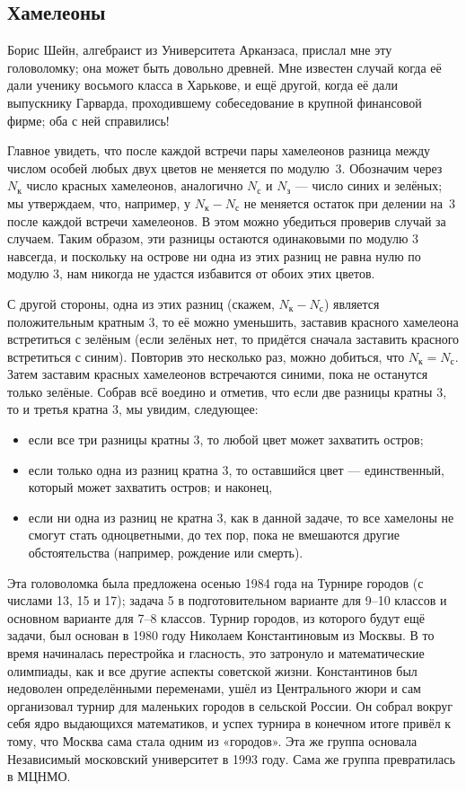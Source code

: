 \subsection*{Хамелеоны}

Борис Шейн, алгебраист из Университета Арканзаса, прислал мне эту головоломку; она может быть довольно древней.
Мне известен случай когда её дали ученику восьмого класса в Харькове,
и ещё другой, когда её дали выпускнику Гарварда, проходившему собеседование в крупной финансовой фирме;
оба с ней справились!

Главное увидеть, что после каждой встречи пары хамелеонов разница между числом особей любых двух цветов не меняется по модулю~3.
Обозначим через $N_{\text{к}}$ число красных хамелеонов, аналогично
$N_{\text{с}}$ и $N_{\text{з}}$ --- число синих и зелёных;
мы утверждаем, что, например, у $N_{\text{к}} - N_{\text{с}}$ не меняется остаток при делении на~$3$ после каждой встречи хамелеонов.
В этом можно убедиться проверив случай за случаем.
Таким образом, эти разницы остаются одинаковыми по модулю 3 навсегда, и поскольку на острове ни одна из этих разниц не равна нулю по модулю 3, нам никогда не удастся избавится от обоих этих цветов.

С другой стороны, одна из этих разниц (скажем, $N_{\text{к}} - N_{\text{с}}$) является положительным кратным $3$, то её можно уменьшить, заставив красного хамелеона встретиться с зелёным (если зелёных нет, то придётся сначала заставить красного встретиться с синим).
Повторив это несколько раз, можно добиться, что $N_{\text{к}} = N_{\text{с}}$.
Затем заставим красных хамелеонов встречаются синими, пока не останутся только зелёные.
Собрав всё воедино и отметив, что если две разницы кратны $3$, то и третья кратна $3$, мы увидим, следующее:
\begin{itemize}
\item если все три разницы кратны 3, то любой цвет может захватить остров;
\item если только одна из разниц кратна 3, то оставшийся цвет --- единственный, который может захватить остров; и наконец,
\item если ни одна из разниц не кратна 3, как в данной задаче, то все хамелоны не смогут стать одноцветными, до тех пор, пока не вмешаются другие обстоятельства (например, рождение или смерть).
\end{itemize}

Эта головоломка была предложена осенью 1984 года на Турнире городов (с числами 13, 15 и 17);
задача 5 в подготовительном варианте для 9--10 классов и основном варианте для 7--8 классов.
Турнир городов, из которого будут ещё задачи, был основан в 1980 году Николаем Константиновым из Москвы.
В то время начиналась перестройка и гласность, это затронуло и математические олимпиады, как и все другие аспекты советской жизни.
Константинов был недоволен определёнными переменами, ушёл из Центрального жюри и сам организовал турнир для маленьких городов в сельской России.
Он собрал вокруг себя ядро выдающихся математиков, и успех турнира в конечном итоге привёл к тому, что Москва сама стала одним из «городов».
Эта же группа основала Независимый московский университет в 1993 году.
Сама же группа превратилась в МЦНМО.

